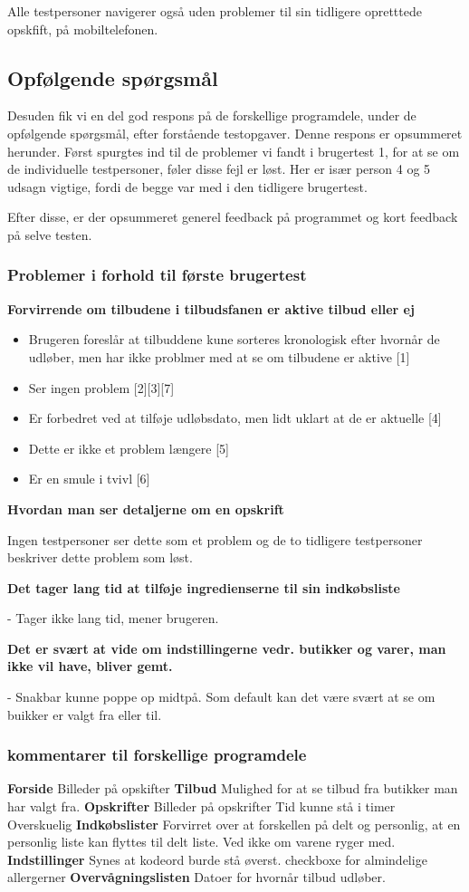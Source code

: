 Alle testpersoner navigerer også uden problemer til sin tidligere opretttede opskfift, på mobiltelefonen.

\subsection{Opfølgende spørgsmål}
Desuden fik vi en del god respons på de forskellige programdele, under de opfølgende spørgsmål, efter forstående testopgaver.
Denne respons er opsummeret herunder.
Først spurgtes ind til de problemer vi fandt i brugertest 1, for at se om de individuelle testpersoner, føler disse fejl er løst. 
Her er især person 4 og 5 udsagn vigtige, fordi de begge var med i den tidligere brugertest.

Efter disse, er der opsummeret generel feedback på programmet og kort feedback på selve testen.

\subsubsection{Problemer i forhold til første brugertest}
\textbf{Forvirrende om tilbudene i tilbudsfanen er aktive tilbud eller ej}
\begin{itemize}
	\item Brugeren foreslår at tilbuddene kune sorteres kronologisk efter hvornår de udløber, men har ikke problmer med at se om tilbudene er aktive [1]
	\item Ser ingen problem [2][3][7]
	\item Er forbedret ved at tilføje udløbsdato, men lidt uklart at de er aktuelle [4]
	\item Dette er ikke et problem længere [5]
	\item Er en smule i tvivl [6]
\end{itemize}
\textbf{Hvordan man ser detaljerne om en opskrift}

Ingen testpersoner ser dette som et problem og de to tidligere testpersoner beskriver dette problem som løst.

\textbf{Det tager lang tid at tilføje ingredienserne til sin indkøbsliste}

 - Tager ikke lang tid, mener brugeren.

\textbf{Det er svært at vide om indstillingerne vedr. butikker og varer, man ikke vil have, bliver gemt.}

 - Snakbar kunne poppe op midtpå. Som default kan det være svært at se om buikker er valgt fra eller til.

\subsubsection{kommentarer til forskellige programdele}
\textbf{Forside}
	Billeder på opskifter
\textbf{Tilbud}
	Mulighed for at se tilbud fra butikker man har valgt fra.
\textbf{Opskrifter}
	Billeder på opskrifter
	Tid kunne stå i timer
	Overskuelig
\textbf{Indkøbslister}
	Forvirret over at forskellen på delt og personlig, at en personlig liste kan flyttes til delt liste. Ved ikke om varene ryger med.
\textbf{Indstillinger}
Synes at kodeord burde stå øverst.
checkboxe for almindelige allergerner
\textbf{Overvågningslisten}
	Datoer for hvornår tilbud udløber.

